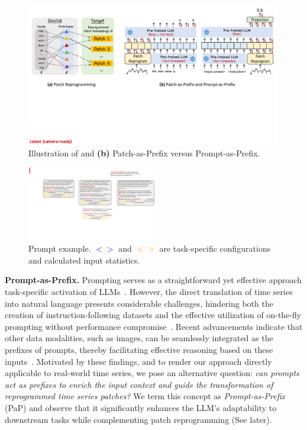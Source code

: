 \begin{figure}[t]
    \centering
    \includegraphics[width=0.99\textwidth]{figures/method-detailed-illustration-v3.pdf}\vspace{-2mm}
    \caption{
    Illustration of  and \textbf{(b)} Patch-as-Prefix versus Prompt-as-Prefix.}
    \label{fig:framework_details}
    \vspace{-5mm}
\end{figure}

\begin{figure}
\vspace{-3.8mm}
\centering
\includegraphics[width=5.8cm]{figures/prompt-example.pdf}
\caption{Prompt example. \textcolor{blue}{$<>$} and \textcolor{orange}{$<>$} are task-specific configurations and calculated input statistics.}
\label{fig:prompt_example}
\vspace{-3.3mm}
\end{figure}

\noindent\textbf{Prompt-as-Prefix.} 
Prompting serves as a straightforward yet effective approach  task-specific activation of LLMs~\citep{yin2023survey}. However, the direct translation of time series into natural language presents considerable challenges, hindering both the creation of instruction-following datasets and the effective utilization of on-the-fly prompting without performance compromise~\citep{xue2022prompt}. Recent advancements indicate that other data modalities, such as images, can be seamlessly integrated as the prefixes of prompts, thereby facilitating effective reasoning based on these inputs~\citep{tsimpoukelli2021multimodal}. Motivated by these findings, and to render our approach directly applicable to real-world time series, we pose an alternative question: \textit{can prompts act as prefixes to enrich the input context and guide the transformation of reprogrammed time series patches?} We term this concept as \textit{Prompt-as-Prefix} (PaP) and observe that it significantly enhances the LLM's adaptability to downstream tasks while complementing patch reprogramming (See  later).

